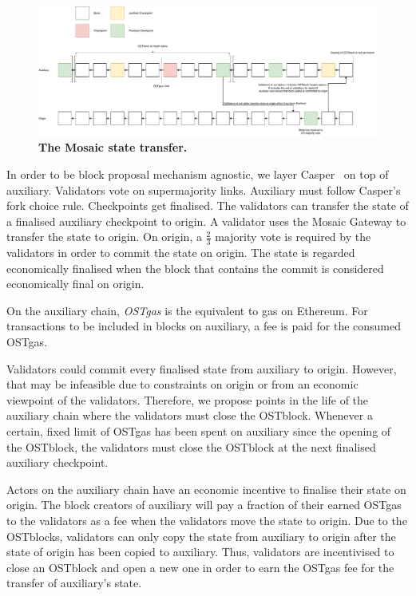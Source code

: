 \documentclass[12pt,a4paper]{article}
\begin{document}
\begin{figure}
    \centering
	\includegraphics[width=\textwidth]{mosaic}
	\caption{\textbf{The Mosaic state transfer.} }%
	\label{fig:mosaic}
\end{figure}
In order to be block proposal mechanism agnostic, we layer Casper~\cite{casperffg} on top of auxiliary.
Validators vote on supermajority links.
Auxiliary must follow Casper's fork choice rule.
Checkpoints get finalised.
The validators can transfer the state of a finalised auxiliary checkpoint to origin.
A validator uses the Mosaic Gateway to transfer the state to origin.
On origin, a $\frac{2}{3	}$ majority vote is required by the validators in order to commit the state on origin.
The state is regarded economically finalised when the block that contains the commit is considered economically final on origin.

On the auxiliary chain, \emph{OSTgas} is the equivalent to gas on Ethereum.
For transactions to be included in blocks on auxiliary, a fee is paid for the consumed OSTgas.

Validators could commit every finalised state from auxiliary to origin.
However, that may be infeasible due to constraints on origin or from an economic viewpoint of the validators.
Therefore, we propose points in the life of the auxiliary chain where the validators must close the OSTblock.
Whenever a certain, fixed limit of OSTgas has been spent on auxiliary since the opening of the OSTblock,
the validators must close the OSTblock at the next finalised auxiliary checkpoint. 

Actors on the auxiliary chain have an economic incentive to finalise their state on origin.
The block creators of auxiliary will pay a fraction of their earned OSTgas to the validators as a fee when the validators move the state to origin.
Due to the OSTblocks, validators can only copy the state from auxiliary to origin after the state of origin has been copied to auxiliary.
Thus, validators are incentivised to close an OSTblock and open a new one in order to earn the OSTgas fee for the transfer of auxiliary's state.
\end{document}
